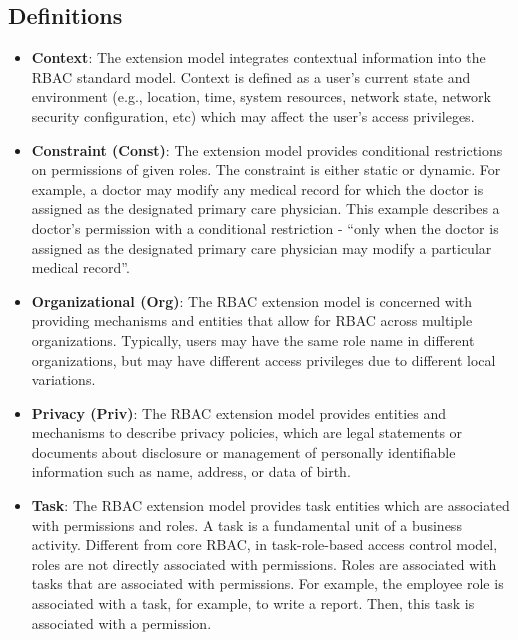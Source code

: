 \subsection{Definitions}

\begin{itemize}

  \item \textbf{Context}: The extension model integrates contextual information into the RBAC standard model. Context is defined as a user's current state and environment (e.g., location, time, system resources, network state, network security configuration, etc) which may affect the user's access privileges.

  \item \textbf{Constraint (Const)}: The extension model provides conditional restrictions on permissions of given roles. The constraint is either static or dynamic. For example, a doctor may modify any medical record for which the doctor is assigned as the designated primary care physician. This example describes a doctor's permission with a conditional restriction - ``only when the doctor is assigned as the designated primary care physician may modify a particular medical record''.

  \item \textbf{Organizational (Org)}: The RBAC extension model is concerned with providing mechanisms and entities that allow for RBAC across multiple organizations. Typically, users may have the same role name in different organizations, but may have different access privileges due to different local variations.
  
  \item \textbf{Privacy (Priv)}: The RBAC extension model provides entities and mechanisms to describe privacy policies, which are legal statements or documents about disclosure or management of personally identifiable information such as name, address, or data of birth.
  
  \item \textbf{Task}: The RBAC extension model provides task entities which are associated with permissions and roles. A task is a fundamental unit of a business activity. Different from core RBAC, in task-role-based access control model, roles are not directly associated with permissions. Roles are associated with tasks that are associated with permissions. For example, the employee role is associated with a task, for example, to write a report. Then, this task is associated with a permission.


\end{itemize}
